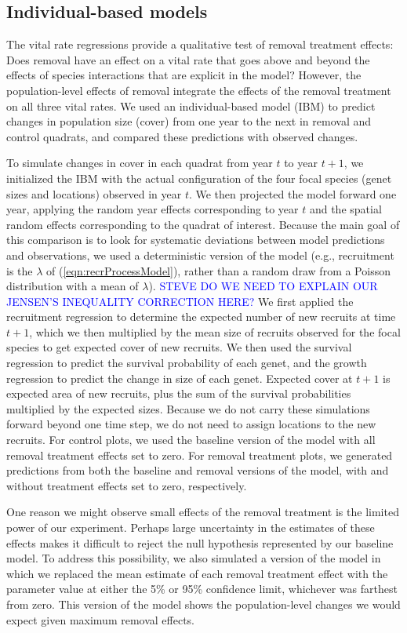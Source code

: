 \documentclass[11pt]{article}
\newcommand{\comment}{\textcolor{blue}}
\begin{document}
\begin{doublespacing}
\subsection*{Individual-based models}

The vital rate regressions provide a qualitative test of removal treatment effects: Does removal have an effect on a vital rate that goes above and beyond the effects of species interactions that are explicit in the model? However, the population-level effects of removal integrate the effects of the removal treatment on all three vital rates. We used an individual-based model (IBM) to predict changes in population size (cover) from one year to the next in removal and control quadrats, and compared these predictions with observed changes. 

To simulate changes in cover in each quadrat from year $t$ to year $t+1$, we initialized the IBM with the actual configuration of the four focal species (genet sizes and locations) observed in year $t$. We then projected the model forward one year, applying the random year effects corresponding to year $t$ and the spatial random effects corresponding to the quadrat of interest. Because the main goal of this comparison is to look for systematic deviations between model predictions and observations, we used a deterministic version of the model (e.g., recruitment is the $\lambda$ of (\ref{eqn:recrProcessModel}), rather than a random draw from a Poisson distribution with a mean of $\lambda$). \comment{STEVE DO WE NEED TO EXPLAIN OUR JENSEN'S INEQUALITY CORRECTION HERE?}
We first applied the recruitment regression to determine the expected number of new recruits at time $t+1$, which we then multiplied by the mean size of recruits observed for the focal species to get expected cover of new recruits. We then used the survival regression to predict the survival probability of each genet, and the growth regression to predict the change in size of each genet. Expected cover at $t+1$ is expected area of new recruits, plus the sum of the survival probabilities multiplied by the expected sizes. Because we do not carry these simulations forward beyond one time step, we do not need to assign locations to the new recruits. For control plots, we used the baseline version of the model with all removal treatment effects set to zero. For removal treatment plots, we generated predictions from both the baseline and removal versions of the model, with and without treatment effects set to zero, respectively.  

One reason we might observe small effects of the removal treatment is the limited power of our experiment. Perhaps large uncertainty in the estimates of these effects makes it difficult to reject the null hypothesis represented by our baseline model. To address this possibility, we also simulated a version of the model in which we replaced the mean estimate of each removal treatment effect with the parameter value at either the 5\% or 95\% confidence limit, whichever was farthest from zero. This version of the model shows the population-level changes we would expect given maximum removal effects.


\end{doublespacing}
\end{document}
